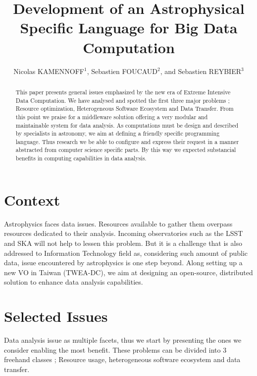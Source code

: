 \documentclass[11pt, twoside]{article}
\begin{document}
	\title{Development of an Astrophysical Specific Language for Big Data Computation}
	\author{Nicolas KAMENNOFF$^1$, Sebastien FOUCAUD$^2$, and Sebastien REYBIER$^3$}

	\begin{abstract}
		This paper presents general issues emphasized by the new era of Extreme Intensive Data Computation.
		We have analysed and spotted the first three major problems ; Resource optimization, Heterogeneous Software Ecosystem and Data Transfer.
		From this point we praise for a middleware solution offering a very modular and maintainable system for data analysis.
		As computations must be design and described by specialists in astronomy, we aim at defining a friendly specific programming language.
		Thus research we be able to configure and express their request in a manner abstracted from computer science specific parts.
		By this way we expected substancial benefits in computing capabilities in data analysis.
	\end{abstract}

	\section{Context}
		Astrophysics faces data issues.
		Resources available to gather them overpass resources dedicated to their analysis.
		Incoming observatories such as the LSST and SKA will not help to lessen this problem.
		But it is a challenge that is also addressed to Information Technology field as, considering such amount of public data, issue encountered by astrophysics is one step beyond.
		Along setting up a new VO in Taiwan (TWEA-DC), we aim at designing an open-source, distributed solution to enhance data analysis capabilities.

	\section{Selected Issues}
		\label{BLINK_ISSUES}
		Data analysis issue as multiple facets, thus we start by presenting the ones we consider enabling the most benefit.
		These problems can be divided into 3 freehand classes ; Resource usage, heterogeneous software ecosystem and data transfer.
		
\end{document}
